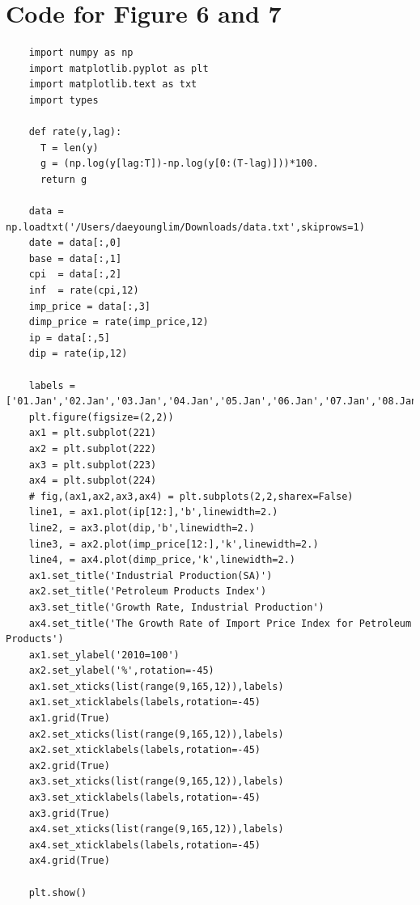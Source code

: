 \documentclass[answers]{exam}
\begin{document}
  \section{Code for Figure 6 and 7}
  \begin{lstlisting}
    import numpy as np
    import matplotlib.pyplot as plt
    import matplotlib.text as txt
    import types

    def rate(y,lag):
      T = len(y)
      g = (np.log(y[lag:T])-np.log(y[0:(T-lag)]))*100.
      return g

    data = np.loadtxt('/Users/daeyounglim/Downloads/data.txt',skiprows=1)
    date = data[:,0]
    base = data[:,1]
    cpi  = data[:,2]
    inf  = rate(cpi,12)
    imp_price = data[:,3]
    dimp_price = rate(imp_price,12)
    ip = data[:,5]
    dip = rate(ip,12)

    labels = ['01.Jan','02.Jan','03.Jan','04.Jan','05.Jan','06.Jan','07.Jan','08.Jan','09.Jan','10.Jan','11.Jan','12.Jan','13.Jan']
    plt.figure(figsize=(2,2))
    ax1 = plt.subplot(221)
    ax2 = plt.subplot(222)
    ax3 = plt.subplot(223)
    ax4 = plt.subplot(224)
    # fig,(ax1,ax2,ax3,ax4) = plt.subplots(2,2,sharex=False)
    line1, = ax1.plot(ip[12:],'b',linewidth=2.)
    line2, = ax3.plot(dip,'b',linewidth=2.)
    line3, = ax2.plot(imp_price[12:],'k',linewidth=2.)
    line4, = ax4.plot(dimp_price,'k',linewidth=2.)
    ax1.set_title('Industrial Production(SA)')
    ax2.set_title('Petroleum Products Index')
    ax3.set_title('Growth Rate, Industrial Production')
    ax4.set_title('The Growth Rate of Import Price Index for Petroleum Products')
    ax1.set_ylabel('2010=100')
    ax2.set_ylabel('%',rotation=-45)
    ax1.set_xticks(list(range(9,165,12)),labels)
    ax1.set_xticklabels(labels,rotation=-45)
    ax1.grid(True)
    ax2.set_xticks(list(range(9,165,12)),labels)
    ax2.set_xticklabels(labels,rotation=-45)
    ax2.grid(True)
    ax3.set_xticks(list(range(9,165,12)),labels)
    ax3.set_xticklabels(labels,rotation=-45)
    ax3.grid(True)
    ax4.set_xticks(list(range(9,165,12)),labels)
    ax4.set_xticklabels(labels,rotation=-45)
    ax4.grid(True)

    plt.show()
  \end{lstlisting}
\end{document}

